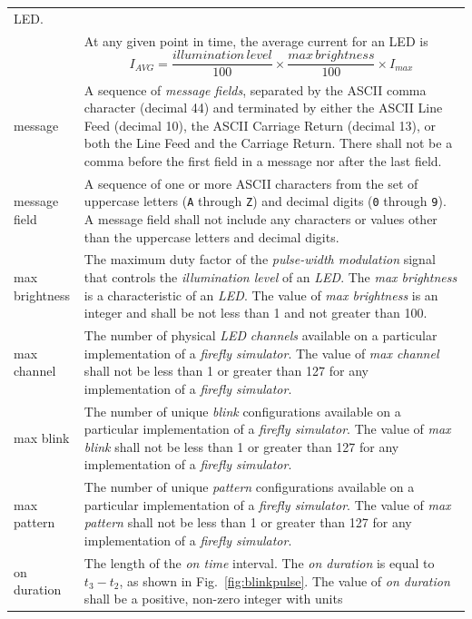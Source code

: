 \documentclass[letterpaper,11pt]{article}
\begin{document}
\begin{supertabular}{p{1.5in}p{5in}}
    LED.\\
    &
    At any given point in time, the average current for an LED is
\[ I_{AVG} = \frac{illumination\,level}{100} \times \frac{max\,brightness}{100}
\times I_{max}\]\\
message &  A sequence of \textit{message fields}, separated by the
    ASCII comma character (decimal 44) and terminated by either the ASCII Line
    Feed (decimal 10), the ASCII Carriage Return (decimal 13), or both the Line
    Feed and the Carriage Return. There shall not be a comma before the first
    field in a message nor after the last field.\\
message field &  A sequence of one or more ASCII characters from the
    set of uppercase letters (\texttt{A} through \texttt{Z}) and decimal digits
    (\texttt{0} through \texttt{9}). A message field shall not include
    any characters or values other than the uppercase letters and decimal
    digits.\\
max brightness & 
    The maximum duty factor of the \textit{pulse-width modulation} signal that
    controls the \textit{illumination level} of an \textit{LED}. The
    \textit{max brightness} is a characteristic of an \textit{LED}. The
    value of \textit{max brightness} is an integer and shall be not less
    than 1 and not greater than 100.\\
max channel & 
    The number of physical \textit{LED} \textit{channels} available on a
    particular implementation of a \textit{firefly simulator}.
    The value of \textit{max channel} shall not be less than 1 or greater
    than 127 for any implementation of a \textit{firefly simulator}.\\
max blink & 
    The number of unique \textit{blink} configurations available on a
    particular implementation of a \textit{firefly simulator}.
    The value of \textit{max blink} shall not be less than 1 or greater
    than 127 for any implementation of a \textit{firefly simulator}.\\
max pattern & 
    The number of unique \textit{pattern} configurations available on a
    particular implementation of a \textit{firefly simulator}.
    The value of \textit{max pattern} shall not be less than 1 or greater
    than 127 for any implementation of a \textit{firefly simulator}.\\
on duration &
    The length of the \textit{on time} interval. The \textit{on duration} is
    equal to $t_3 - t_2$, as shown in Fig.\ \ref{fig:blinkpulse}. The value
    of \textit{on duration} shall be a positive, non-zero integer with units

\end{supertabular}
\end{document}
